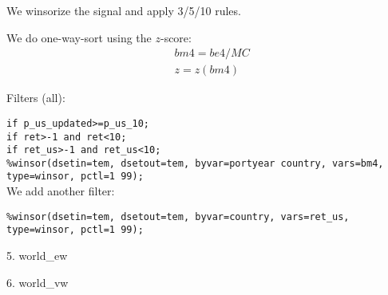 

\usepackage[T1]{fontenc}




\thispagestyle{fancy}

\newcommand{\code}{\texttt}
\newcommand*{\Commonpath}{20190107/bm4/winsorized}

We winsorize the signal and apply 3/5/10 rules.

We do one-way-sort using the $z$-score:
$$
\begin{aligned}
& bm4 = be4/MC \\
& z = z(bm4)
\end{aligned}
$$

Filters (all):

\code{if p\_us\_updated>=p\_us\_10;} \\
\code{if ret>-1 and ret<10;} \\
\code{if ret\_us>-1 and ret\_us<10;} \\
\code{\%winsor(dsetin=tem, dsetout=tem, byvar=portyear country, vars=bm4, type=winsor, pctl=1 99);} \\

We add another filter:

\code{\%winsor(dsetin=tem, dsetout=tem, byvar=country, vars=ret\_us, type=winsor, pctl=1 99);}

\small

% 

% 

% 

% 

5. world\_ew


6. world\_vw




